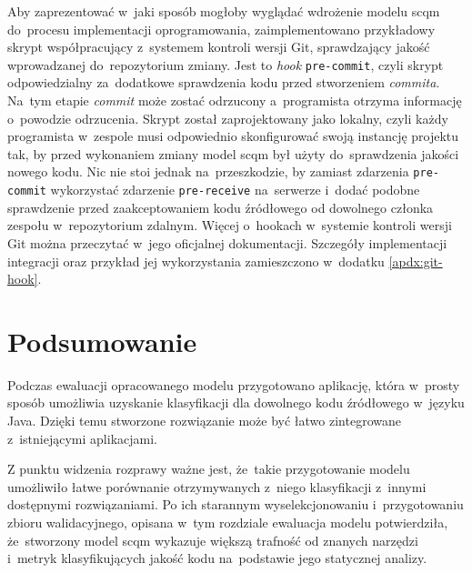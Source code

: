 \documentclass[twoside]{praca}
\begin{document}
Aby zaprezentować w~jaki sposób mogłoby wyglądać wdrożenie modelu \gls{scqm} do~procesu implementacji oprogramowania, zaimplementowano przykładowy skrypt współpracujący z~systemem kontroli wersji Git, sprawdzający jakość wprowadzanej do~repozytorium zmiany. Jest to \textit{hook} \texttt{pre-commit}, czyli skrypt odpowiedzialny za~dodatkowe sprawdzenia kodu przed stworzeniem \textit{commita}. Na~tym etapie \textit{commit} może zostać odrzucony a~programista otrzyma informację o~powodzie odrzucenia. Skrypt został zaprojektowany jako lokalny, czyli każdy programista w~zespole musi odpowiednio skonfigurować swoją instancję projektu tak, by przed wykonaniem zmiany model \gls{scqm} był użyty do~sprawdzenia jakości nowego kodu. Nic nie stoi jednak na~przeszkodzie, by zamiast zdarzenia \texttt{pre-commit} wykorzystać zdarzenie \texttt{pre-receive} na~serwerze i~dodać podobne sprawdzenie przed zaakceptowaniem kodu źródłowego od dowolnego członka zespołu w~repozytorium zdalnym. Więcej o~hookach w~systemie kontroli wersji Git można przeczytać w~jego oficjalnej dokumentacji\cite{gitbook}. Szczegóły implementacji integracji oraz przykład jej wykorzystania zamieszczono w~dodatku \ref{apdx:git-hook}.

\section{Podsumowanie}
Podczas ewaluacji opracowanego modelu przygotowano aplikację, która w~prosty sposób umożliwia uzyskanie klasyfikacji dla dowolnego kodu źródłowego w~języku Java. Dzięki temu stworzone rozwiązanie może być łatwo zintegrowane z~istniejącymi aplikacjami.

Z punktu widzenia rozprawy ważne jest, że~takie przygotowanie modelu umożliwiło łatwe porównanie otrzymywanych z~niego klasyfikacji z~innymi dostępnymi rozwiązaniami. Po ich starannym wyselekcjonowaniu i~przygotowaniu zbioru walidacyjnego, opisana w~tym rozdziale ewaluacja modelu potwierdziła, że~stworzony model \gls{scqm} wykazuje większą trafność od znanych narzędzi i~metryk klasyfikujących jakość kodu na~podstawie jego statycznej analizy.

% 
% 
\cleardoublepage
\end{document}
